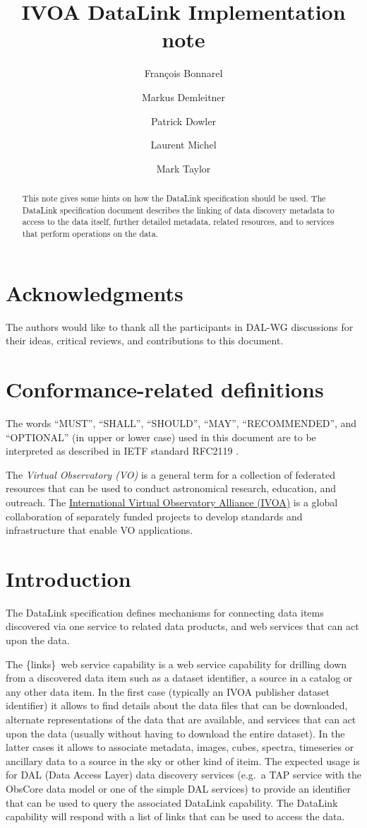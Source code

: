 \documentclass[11pt,a4paper]{ivoa}
\title{IVOA DataLink Implementation note}
\author[http://www.ivoa.net/twiki/bin/view/IVOA/FrancoisBonnarel]
       {Fran\c{c}ois Bonnarel}
\author[http://www.ivoa.net/twiki/bin/view/IVOA/MarkusDemleitner]
       {Markus Demleitner}
\author[http://www.ivoa.net/twiki/bin/view/IVOA/PatrickDowler]
       {Patrick Dowler}
\author[http://www.ivoa.net/twiki/bin/view/IVOA/LaurentMichel]
       {Laurent Michel}
\author[http://www.ivoa.net/twiki/bin/view/IVOA/MarkTaylor]
       {Mark Taylor}
\newcommand{\blinks}{\{links\}}
\begin{document}
\begin{abstract}
This note gives some hints on how the DataLink specification should be used. The DataLink 
specification document \citep{2023ivoa.spec.0617D} describes the linking of data discovery 
metadata to access to the data itself, further detailed metadata, related resources, and 
to services that perform operations on the data. 
\end{abstract}


\section*{Acknowledgments}

The authors would like to thank all the participants in DAL-WG discussions
for their ideas, critical reviews, and contributions to this document.


\section*{Conformance-related definitions}

The words ``MUST'', ``SHALL'', ``SHOULD'', ``MAY'', ``RECOMMENDED'', and
``OPTIONAL'' (in upper or lower case) used in this document are to be
interpreted as described in IETF standard RFC2119 \citep{std:RFC2119}.

The \emph{Virtual Observatory (VO)} is a
general term for a collection of federated resources that can be used
to conduct astronomical research, education, and outreach.
The \href{http://www.ivoa.net}{International
Virtual Observatory Alliance (IVOA)} is a global
collaboration of separately funded projects to develop standards and
infrastructure that enable VO applications.


\section{Introduction}

The DataLink  specification \citep{2023ivoa.spec.0617D} defines mechanisms for connecting 
data items discovered via one service to  related data products, and web services
that can act upon the data.

The \blinks\ web service capability is a web service capability for drilling
down from a discovered data item such as  a dataset identifier, a source in a
catalog or any other data item. In the first case (typically an IVOA publisher
dataset identifier) it allows to find details about the data files that can be
downloaded, alternate representations of the data that are available, and
services that can act upon the data (usually without having to download
the entire dataset). In the latter cases it allows to associate metadata, images,
cubes, spectra, timeseries or ancillary data to a source in the sky or other
kind of iteim. The expected usage is for DAL (Data Access Layer)
data discovery services (e.g.\ a TAP service \citep{2010ivoa.spec.0327D}
with the ObsCore \citep{2017ivoa.spec.0509L} data
model or one of the simple DAL services) to provide an identifier that
can be used to query the associated DataLink capability. The DataLink
capability will respond with a list of links that can be used to access
the data. 
\end{document}
